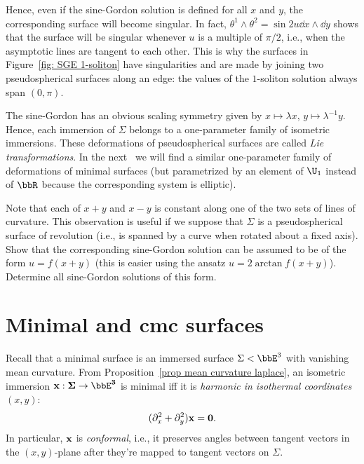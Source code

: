 Hence, even if the sine-Gordon solution is defined for all $x$ and $y$, the corresponding surface will become singular. In fact, $\theta^1\wedge\theta^2=\sin 2u \dd x\wedge \dd y$ shows that the surface will be singular whenever $u$ is a multiple of $\pi/2$, i.e., when the asymptotic lines are tangent to each other. This is why the surfaces in Figure~\ref{fig: SGE 1-soliton} have singularities and are made by joining two pseudospherical surfaces along an edge: the values of the $1$-soliton solution always span $(0,\pi)$.

\begin{rem}
    The sine-Gordon has an obvious scaling symmetry given by $x\mapsto \lambda x$, $y\mapsto \lambda^{-1}y$. Hence, each immersion of $\Sigma$ belongs to a one-parameter family of isometric immersions. These deformations of pseudospherical surfaces are called \emph{Lie transformations}. In the next \sect\ we will find a similar one-parameter family of deformations of minimal surfaces (but parametrized by an element of $\U_1$ instead of $\bbR$ because the corresponding system is elliptic).
\end{rem}

\begin{xca}\label{xca 7.4.19 Ivey}
    Note that each of $x+y$ and $x-y$ is constant along one of the two sets of lines of curvature. 
    This observation is useful if we suppose that $\Sigma$ is a pseudospherical surface of revolution (i.e., is spanned by a curve when rotated about a fixed axis). Show that the corresponding sine-Gordon solution can be assumed to be of the form $u=f(x+y)$ (this is easier using the ansatz $u=2\arctan f(x+y)$). Determine all sine-Gordon solutions of this form. 
\end{xca}







\section{Minimal and \texorpdfstring{\gls{cmc}}{CMC} surfaces}

Recall that a minimal surface is an immersed surface $\Sigma<\bbE^3$ with vanishing mean curvature. From Proposition~\ref{prop mean curvature laplace}, an isometric immersion $\bf{x}:\Sigma\to \bbE^3$ is minimal iff it is \emph{harmonic in isothermal coordinates} $(x,y)$:
\[(\partial_x^2+\partial_y^2)\bf{x}=0.\]
In particular, $\bf{x}$ is \emph{conformal}, i.e., it preserves angles between tangent vectors in the $(x,y)$-plane after they're mapped to tangent vectors on $\Sigma$.

